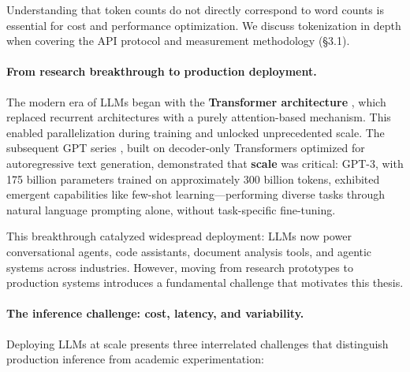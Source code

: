 \documentclass[english]{article}
\begin{document}
\noindent Understanding that token counts do not directly correspond to word counts is essential for cost and performance optimization. We discuss tokenization in depth when covering the API protocol and measurement methodology (§3.1).

\paragraph{From research breakthrough to production deployment.}

The modern era of LLMs began with the \textbf{Transformer architecture} \parencite{vaswani2017attention}, which replaced recurrent architectures with a purely attention-based mechanism. This enabled parallelization during training and unlocked unprecedented scale. The subsequent GPT series \parencite{radford2018improving,radford2019language,brown2020language}, built on decoder-only Transformers optimized for autoregressive text generation, demonstrated that \textbf{scale} was critical: GPT-3, with 175 billion parameters trained on approximately 300 billion tokens, exhibited emergent capabilities like few-shot learning—performing diverse tasks through natural language prompting alone, without task-specific fine-tuning.

This breakthrough catalyzed widespread deployment: LLMs now power conversational agents, code assistants, document analysis tools, and agentic systems across industries. However, moving from research prototypes to production systems introduces a fundamental challenge that motivates this thesis.

\paragraph{The inference challenge: cost, latency, and variability.}

Deploying LLMs at scale presents three interrelated challenges that distinguish production inference from academic experimentation:
\end{document}
